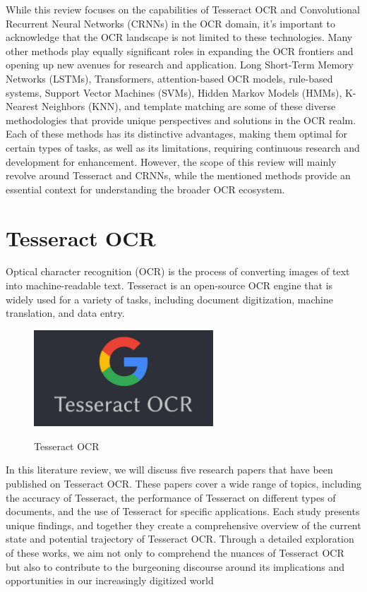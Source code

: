 While this review focuses on the capabilities of Tesseract OCR and Convolutional Recurrent Neural Networks (CRNNs) in the OCR domain, it's important to acknowledge that the OCR landscape is not limited to these technologies. Many other methods play equally significant roles in expanding the OCR frontiers and opening up new avenues for research and application. Long Short-Term Memory Networks (LSTMs), Transformers, attention-based OCR models, rule-based systems, Support Vector Machines (SVMs), Hidden Markov Models (HMMs), K-Nearest Neighbors (KNN), and template matching are some of these diverse methodologies that provide unique perspectives and solutions in the OCR realm. Each of these methods has its distinctive advantages, making them optimal for certain types of tasks, as well as its limitations, requiring continuous research and development for enhancement. However, the scope of this review will mainly revolve around Tesseract and CRNNs, while the mentioned methods provide an essential context for understanding the broader OCR ecosystem.

\newpage

\section{Tesseract OCR}

Optical character recognition (OCR) is the process of converting images of text into machine-readable text. Tesseract is an open-source OCR engine that is widely used for a variety of tasks, including document digitization, machine translation, and data entry.

\vspace{1cm}

\begin{figure}[ht]
    \centering
    \includegraphics[width=0.6\textwidth]{Figures/tesseract_ocr.jpg}
    \caption[Tesseract OCR]{Tesseract OCR}\cite{liTrOCRTransformerBasedOptical2023}
    \label{fig:Tesseract OCR}
\end{figure}


In this literature review, we will discuss five research papers that have been published on Tesseract OCR. These papers cover a wide range of topics, including the accuracy of Tesseract, the performance of Tesseract on different types of documents, and the use of Tesseract for specific applications. Each study presents unique findings, and together they create a comprehensive overview of the current state and potential trajectory of Tesseract OCR. Through a detailed exploration of these works, we aim not only to comprehend the nuances of Tesseract OCR but also to contribute to the burgeoning discourse around its implications and opportunities in our increasingly digitized world

